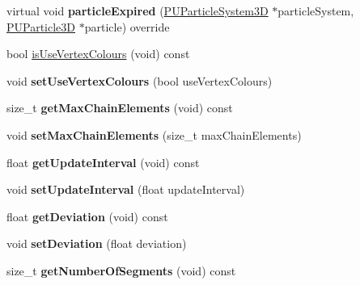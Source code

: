 \begin{DoxyCompactItemize}
\item 
\mbox{\label{classPUBeamRender_a71f175e86748ddbffec37c4b7ede968a}} 
virtual void {\bfseries particle\+Expired} (\hyperlink{classPUParticleSystem3D}{P\+U\+Particle\+System3D} $\ast$particle\+System, \hyperlink{structPUParticle3D}{P\+U\+Particle3D} $\ast$particle) override
\item 
bool \hyperlink{classPUBeamRender_a2d144c9e1b72dca28de6b1a47a724820}{is\+Use\+Vertex\+Colours} (void) const
\item 
\mbox{\label{classPUBeamRender_afa47e268a199f44cf542e38f4445e7d6}} 
void {\bfseries set\+Use\+Vertex\+Colours} (bool use\+Vertex\+Colours)
\item 
\mbox{\label{classPUBeamRender_af68debe9f6b40e3989e462a347e75434}} 
size\+\_\+t {\bfseries get\+Max\+Chain\+Elements} (void) const
\item 
\mbox{\label{classPUBeamRender_a110ba05b68604b5dd26c34cc7c4c3c0b}} 
void {\bfseries set\+Max\+Chain\+Elements} (size\+\_\+t max\+Chain\+Elements)
\item 
\mbox{\label{classPUBeamRender_ac0d2723c268db55a27aaf407eac4bf21}} 
float {\bfseries get\+Update\+Interval} (void) const
\item 
\mbox{\label{classPUBeamRender_a6e23539c47ccc92cb276c7e61177a541}} 
void {\bfseries set\+Update\+Interval} (float update\+Interval)
\item 
\mbox{\label{classPUBeamRender_a335f485befb89b690810631244b866ae}} 
float {\bfseries get\+Deviation} (void) const
\item 
\mbox{\label{classPUBeamRender_a661c472013a9e3609801d9cb45ced9f9}} 
void {\bfseries set\+Deviation} (float deviation)
\item 
\mbox{\label{classPUBeamRender_a81a35a8e74e572ce37779405dcf538b7}} 
size\+\_\+t {\bfseries get\+Number\+Of\+Segments} (void) const
\item 
\mbox{\label{classPUBeamRender_a5a5a91d5a08d68c8655ed4aec519798a}} 

\end{DoxyCompactItemize}
